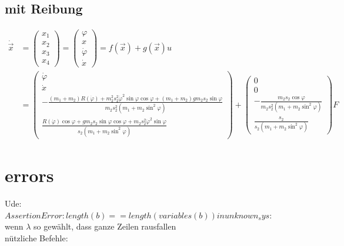 \documentclass[arbeit=studie,oneside,BCOR=12mm]{ArbeitRST}
\begin{document}
\subsection{mit Reibung}
\begin{align}
\dot{\vec{x}} &= \begin{pmatrix}
	x_1  \\
	x_2  \\
	x_3  \\ 
	x_4	
\end{pmatrix} 	=	\begin{pmatrix}
						\varphi \\
						x  \\
						\dot{\varphi}  \\ 
						\dot{x}
					\end{pmatrix} = f(\vec{x}) + g(\vec{x}) u\\
&=\begin{pmatrix}
	\dot{\varphi}  \\
	\dot{x}  \\
	-\frac{(m_1+m_2)R(\dot{\varphi}) + m_2^2s_2^2\dot{\varphi}^2\sin\varphi\cos\varphi + (m_1+m_2)gm_2s_2\sin\varphi}{m_2s_2^2(m_1 + m_2\sin^2\varphi)}\\
	\frac{R(\dot{\varphi})\cos\varphi + gm_2s_2\sin\varphi\cos\varphi + m_2s_2^2\dot{\varphi}^2\sin\varphi}{s_2(m_1+m_2\sin^2\varphi)}   
\end{pmatrix}		 +		 \begin{pmatrix}
								0  \\
								0  \\
								-\frac{m_2s_2\cos\varphi}{m_2s_2^2(m_1 + m_2\sin^2\varphi)}\\
								\frac{s_2}{s_2(m_1+m_2\sin^2\varphi)}   
							\end{pmatrix} F
\end{align}

\section{errors}
Ude:\\
$AssertionError: length(b) == length(variables(b)) in unknown_sys:$\\
wenn $\lambda$ so gewählt, dass ganze Zeilen rausfallen\\
nützliche Befehle: %



\printbibliography
\end{document}
